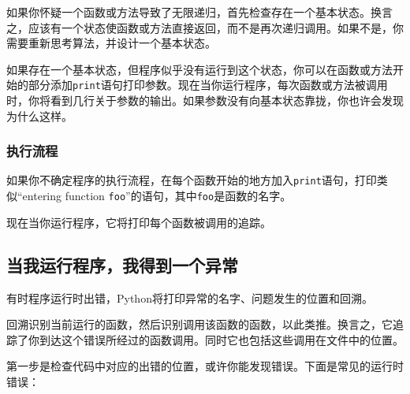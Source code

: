 如果你怀疑一个函数或方法导致了无限递归，首先检查存在一个基本状态。换言之，应该有一个状态使函数或方法直接返回，而不是再次递归调用。如果不是，你需要重新思考算法，并设计一个基本状态。

如果存在一个基本状态，但程序似乎没有运行到这个状态，你可以在函数或方法开始的部分添加{\tt print}语句打印参数。现在当你运行程序，每次函数或方法被调用时，你将看到几行关于参数的输出。如果参数没有向基本状态靠拢，你也许会发现为什么这样。


\subsubsection{执行流程}

如果你不确定程序的执行流程，在每个函数开始的地方加入{\tt print}语句，打印类似“entering function {\tt foo}”的语句，其中{\tt foo}是函数的名字。

现在当你运行程序，它将打印每个函数被调用的追踪。


\subsection{当我运行程序，我得到一个异常}

有时程序运行时出错，Python将打印异常的名字、问题发生的位置和回溯。


回溯识别当前运行的函数，然后识别调用该函数的函数，以此类推。换言之，它追踪了你到达这个错误所经过的函数调用。同时它也包括这些调用在文件中的位置。

第一步是检查代码中对应的出错的位置，或许你能发现错误。下面是常见的运行时错误：

